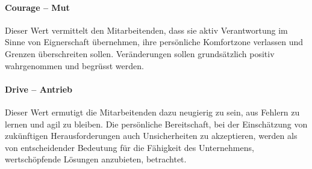 \paragraph*{Courage -- Mut}\mbox{} 

\begin{sloppypar}
Dieser Wert vermittelt den Mitarbeitenden, dass sie aktiv Verantwortung im Sinne von Eignerschaft übernehmen, ihre persönliche Komfortzone verlassen und Grenzen überschreiten sollen. Veränderungen sollen grundsätzlich positiv wahrgenommen und begrüsst werden. 
\end{sloppypar}

\paragraph*{Drive -- Antrieb}\mbox{} 

\begin{sloppypar}
Dieser Wert ermutigt die Mitarbeitenden dazu neugierig zu sein, aus Fehlern zu lernen und agil zu bleiben. Die persönliche Bereitschaft, bei der Einschätzung von zukünftigen Herausforderungen auch Unsicherheiten zu akzeptieren, werden als von entscheidender Bedeutung für die Fähigkeit des Unternehmens, wertschöpfende Lösungen anzubieten, betrachtet.
\end{sloppypar}
